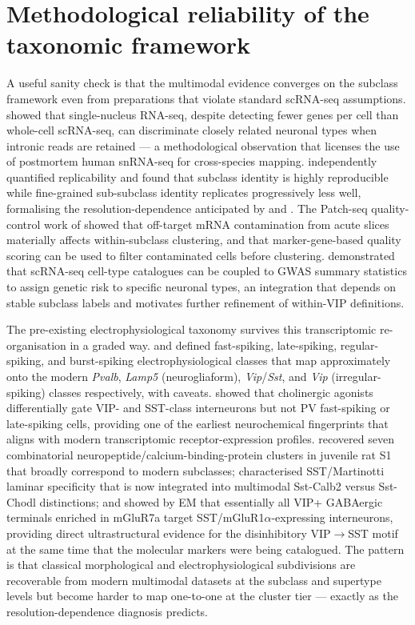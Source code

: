 \documentclass[11pt]{article}
\let\origrightarrow\rightarrow
\def\rightarrow{\ensuremath{\origrightarrow}}
\begin{document}
\section{Methodological reliability of the taxonomic framework}

A useful sanity check is that the multimodal evidence converges on the subclass framework even from preparations that violate standard scRNA-seq assumptions. \citet{Bakken2018} showed that single-nucleus RNA-seq, despite detecting fewer genes per cell than whole-cell scRNA-seq, can discriminate closely related neuronal types when intronic reads are retained --- a methodological observation that licenses the use of postmortem human snRNA-seq for cross-species mapping. \citet{Crow2018} independently quantified replicability and found that subclass identity is highly reproducible while fine-grained sub-subclass identity replicates progressively less well, formalising the resolution-dependence anticipated by \citet{Tasic2016} and \citet{Tasic2018}. The Patch-seq quality-control work of \citet{Tripathy2018} showed that off-target mRNA contamination from acute slices materially affects within-subclass clustering, and that marker-gene-based quality scoring can be used to filter contaminated cells before clustering. \citet{Watanabe2019} demonstrated that scRNA-seq cell-type catalogues can be coupled to GWAS summary statistics to assign genetic risk to specific neuronal types, an integration that depends on stable subclass labels and motivates further refinement of within-VIP definitions.

The pre-existing electrophysiological taxonomy survives this transcriptomic re-organisation in a graded way. \citet{Kawaguchi1996} and \citet{Kawaguchi1997a} defined fast-spiking, late-spiking, regular-spiking, and burst-spiking electrophysiological classes that map approximately onto the modern \textit{Pvalb}, \textit{Lamp5} (neurogliaform), \textit{Vip}/\textit{Sst}, and \textit{Vip} (irregular-spiking) classes respectively, with caveats. \citet{Kawaguchi1997b} showed that cholinergic agonists differentially gate VIP- and SST-class interneurons but not PV fast-spiking or late-spiking cells, providing one of the earliest neurochemical fingerprints that aligns with modern transcriptomic receptor-expression profiles. \citet{Toledorodriguez2005} recovered seven combinatorial neuropeptide/calcium-binding-protein clusters in juvenile rat S1 that broadly correspond to modern subclasses; \citet{Wang2004b} characterised SST/Martinotti laminar specificity that is now integrated into multimodal Sst-Calb2 versus Sst-Chodl distinctions; and \citet{Dalezios2002} showed by EM that essentially all VIP+ GABAergic terminals enriched in mGluR7a target SST/mGluR1$\alpha$-expressing interneurons, providing direct ultrastructural evidence for the disinhibitory VIP\rightarrow SST motif at the same time that the molecular markers were being catalogued. The pattern is that classical morphological and electrophysiological subdivisions are recoverable from modern multimodal datasets at the subclass and supertype levels but become harder to map one-to-one at the cluster tier --- exactly as the resolution-dependence diagnosis predicts.
\end{document}
